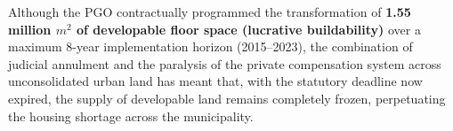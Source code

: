 




Although the PGO contractually programmed the transformation of \textbf{1.55 million $m^2$ of developable floor space (lucrative buildability)} over a maximum 8-year implementation horizon (2015–2023), the combination of judicial annulment and the paralysis of the private compensation system across unconsolidated urban land has meant that, with the statutory deadline now expired, the supply of developable land remains completely frozen, perpetuating the housing shortage across the municipality.

